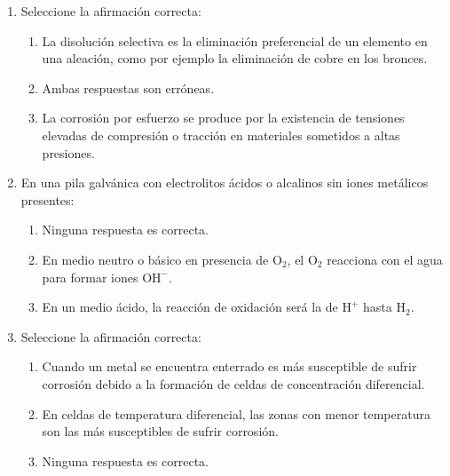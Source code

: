 \begin{enumerate}
    \item Seleccione la afirmación correcta:
          \begin{enumerate}[label=\alph*.]
              \item La disolución selectiva es la eliminación preferencial de un elemento en una aleación, como por ejemplo la eliminación de cobre en los bronces.
              \item \textcolor{red!85!black}{Ambas respuestas son erróneas.}
              \item La corrosión por esfuerzo se produce por la existencia de tensiones elevadas de compresión o tracción en materiales sometidos a altas presiones.
          \end{enumerate}

    \item En una pila galvánica con electrolitos ácidos o alcalinos sin iones metálicos presentes:
          \begin{enumerate}[label=\alph*.]
              \item Ninguna respuesta es correcta.
              \item \textcolor{red!85!black}{En medio neutro o básico en presencia de $\text{O}_2$, el $\text{O}_2$ reacciona con el agua para formar iones $\text{OH}^-$.}
              \item En un medio ácido, la reacción de oxidación será la de $\text{H}^+$ hasta $\text{H}_2$.
          \end{enumerate}

    \item Seleccione la afirmación correcta:
          \begin{enumerate}[label=\alph*.]
              \item \textcolor{red!85!black}{Cuando un metal se encuentra enterrado es más susceptible de sufrir corrosión debido a la formación de celdas de concentración diferencial.}
              \item En celdas de temperatura diferencial, las zonas con menor temperatura son las más susceptibles de sufrir corrosión.
              \item Ninguna respuesta es correcta.
          \end{enumerate}


\end{enumerate}
